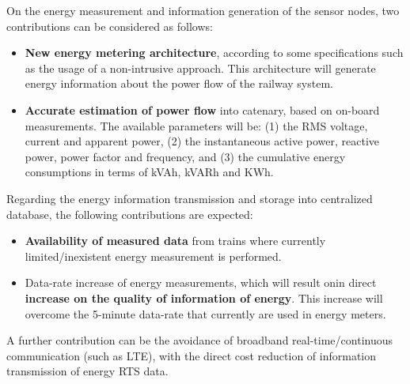 On the energy measurement and information generation of the sensor nodes, two contributions can be considered as follows:

\begin{itemize}
	\setlength\itemsep{0em}
	
	\item \textbf{New energy metering architecture}, according to some specifications such as the usage of a non-intrusive approach.
	This architecture will generate energy information about the power flow of the railway system.
	
	\item \textbf{Accurate estimation of power flow} into catenary, based on on-board measurements. The available parameters will be: (1) the RMS voltage, current and apparent power, (2) the instantaneous active power, reactive power, power factor and frequency, and (3) the cumulative energy consumptions in terms of kVAh, kVARh and KWh.
	
	
\end{itemize}


Regarding the energy information transmission and storage into centralized database, the following contributions are expected:


\begin{itemize}
	\setlength\itemsep{0em}
	
	\item \textbf{Availability of measured data} from trains where currently limited/inexistent energy measurement is performed.
	
	\item Data-rate increase of energy measurements, which will result onin direct \textbf{increase on the quality of information of energy}. This increase will overcome the 5-minute data-rate that currently are used in energy meters.

	
	
\end{itemize}

A further contribution can be the avoidance of broadband real-time/continuous communication (such as \ac{LTE}), with the direct cost reduction of information transmission of energy \ac{RTS} data.

